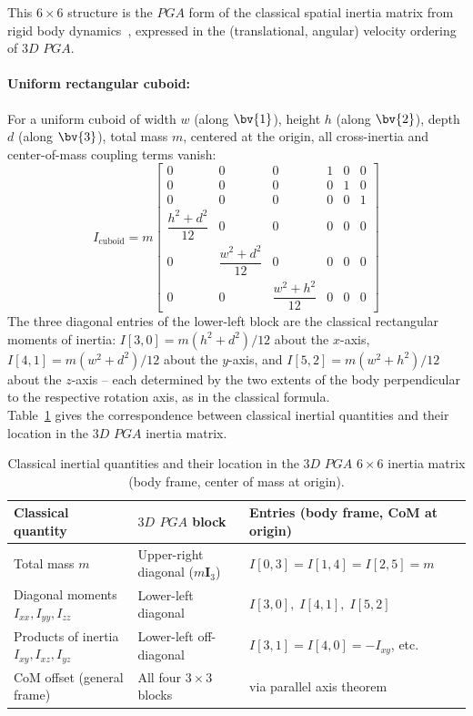 This $6\times6$ structure is the $PGA$ form of the classical spatial inertia matrix from
rigid body dynamics~\cite{Dynamics_in_PGA_plane-based_Dorst-DeKennik:2023}, expressed in
the (translational, angular) velocity ordering of $3D$ $PGA$.

\paragraph{Uniform rectangular cuboid:} For a uniform cuboid of width $w$ (along $\bv{1}$),
height $h$ (along $\bv{2}$), depth $d$ (along $\bv{3}$), total mass $m$, centered at the
origin, all cross-inertia and center-of-mass coupling terms vanish:
\begin{equation}
    I_\mathrm{cuboid} = m
    \begin{bmatrix}
        0 & 0 & 0 & 1 & 0 & 0 \\[4pt]
        0 & 0 & 0 & 0 & 1 & 0 \\[4pt]
        0 & 0 & 0 & 0 & 0 & 1 \\[4pt]
        \dfrac{h^2+d^2}{12} & 0 & 0 & 0 & 0 & 0 \\[10pt]
        0 & \dfrac{w^2+d^2}{12} & 0 & 0 & 0 & 0 \\[10pt]
        0 & 0 & \dfrac{w^2+h^2}{12} & 0 & 0 & 0
    \end{bmatrix}
    \label{eq:inertia_cuboid}
\end{equation}
The three diagonal entries of the lower-left block are the classical rectangular moments
of inertia: $I[3,0] = m(h^2+d^2)/12$ about the $x$-axis, $I[4,1] = m(w^2+d^2)/12$ about
the $y$-axis, and $I[5,2] = m(w^2+h^2)/12$ about the $z$-axis -- each determined by the
two extents of the body perpendicular to the respective rotation axis, as in the classical
formula. \\

Table~\ref{tab:classical_pga3dp} gives the correspondence between classical inertial
quantities and their location in the $3D$ $PGA$ inertia matrix.

\begin{table}[h!]
\centering\small
\begin{tabular}{p{3.1cm}|p{4.6cm}|p{4.7cm}}
\hline
Classical quantity & $3D$ $PGA$ block & Entries (body frame, CoM at origin) \\
\hline
Total mass $m$ & Upper-right diagonal ($m\mathbf{I}_3$) & $I[0,3]=I[1,4]=I[2,5]=m$ \\
Diagonal moments $I_{xx}, I_{yy}, I_{zz}$ & Lower-left diagonal & $I[3,0],\; I[4,1],\;
I[5,2]$ \\
Products of inertia $I_{xy}, I_{xz}, I_{yz}$ & Lower-left off-diagonal &
$I[3,1]=I[4,0]=-I_{xy}$, etc. \\
CoM offset (general frame) & All four $3\times3$ blocks & via parallel axis theorem \\
\hline
\end{tabular}
\caption{Classical inertial quantities and their location in the $3D$ $PGA$ $6\times6$
inertia matrix (body frame, center of mass at origin).}
\label{tab:classical_pga3dp}
\end{table}

